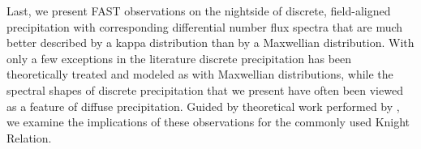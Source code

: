Last, we present FAST observations on the nightside of discrete,
field-aligned precipitation with corresponding differential number
flux spectra that are much better described by a kappa distribution
than by a Maxwellian distribution. With only a few exceptions in the
literature discrete precipitation has been theoretically treated and
modeled as with Maxwellian distributions, while the spectral shapes of
discrete precipitation that we present have often been viewed as a
feature of diffuse precipitation. Guided by theoretical work performed
by \citet{Dors1999}, we examine the implications of
these observations for the commonly used Knight Relation.


% 
